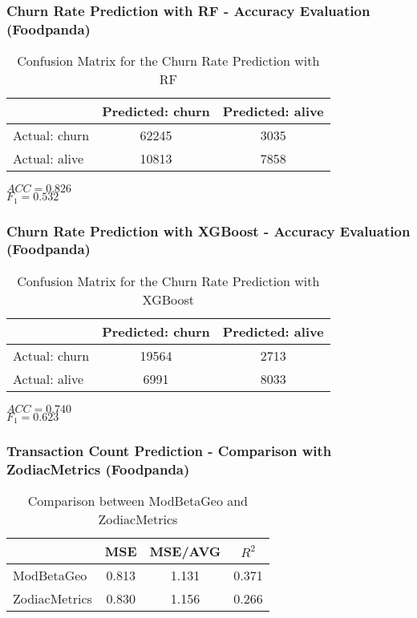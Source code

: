 \documentclass{beamer} %
\theoremstyle{definition} %
\begin{document}
\begin{frame}
\frametitle{Churn Rate Prediction with RF - Accuracy Evaluation (Foodpanda)}
\begin{center}
            \begin{table}
\begin{tabular}{l | c | c }
 & Predicted: churn & Predicted: alive\\
\hline \hline
Actual: churn & 62245 & 3035\\ 
Actual: alive & 10813 & 7858
\end{tabular}
\caption{Confusion Matrix for the Churn Rate Prediction with RF}
\end{table}
        \end{center}      
       
\begin{rmk}
	$ACC=0.826$ \\    
    $F_1=0.532$
\end{rmk}
\end{frame}

\begin{frame}
\frametitle{Churn Rate Prediction with XGBoost - Accuracy Evaluation (Foodpanda)}
\begin{center}
            \begin{table}
\begin{tabular}{l | c | c }
 & Predicted: churn & Predicted: alive\\
\hline \hline
Actual: churn & 19564 & 2713\\ 
Actual: alive & 6991 & 8033
\end{tabular}
\caption{Confusion Matrix for the Churn Rate Prediction with XGBoost}
\end{table}
        \end{center}      
       
\begin{rmk}
	$ACC=0.740$ \\    
    $F_1=0.623$
\end{rmk}
\end{frame}

\begin{frame}
\frametitle{Transaction Count Prediction - Comparison with ZodiacMetrics (Foodpanda)}
\begin{center}
            \begin{table}
\begin{tabular}{l | c | c | c}
 & MSE & MSE/AVG & $R^2$\\
\hline \hline
ModBetaGeo & 0.813 & 1.131 & 0.371\\ 
ZodiacMetrics & 0.830 & 1.156 & 0.266
\end{tabular}
\caption{Comparison between ModBetaGeo and ZodiacMetrics}
\end{table}
        \end{center}      
       
\end{frame}
\end{document}
